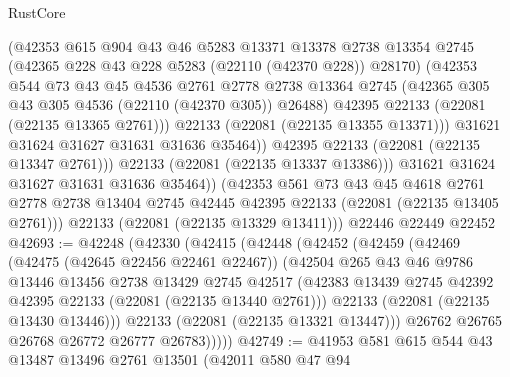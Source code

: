 \begin{lexlean}{RustCore}
\begin{coremodule}
                  (@42353
                    @615
                    @904
                    @43
                    @46
                    @5283
                    @13371
                    @13378
                    @2738
                    @13354
                    @2745
                    (@42365 @228 @43 @228 @5283 (@22110 (@42370 @228)) @28170)
                    (@42353
                      @544
                      @73
                      @43
                      @45
                      @4536
                      @2761
                      @2778
                      @2738
                      @13364
                      @2745
                      (@42365 @305 @43 @305 @4536 (@22110 (@42370 @305)) @26488)
                      @42395
                      @22133
                      (@22081 (@22135 @13365 @2761)))
                    @22133
                    (@22081 (@22135 @13355 @13371)))
                  @31621
                  @31624
                  @31627
                  @31631
                  @31636
                  @35464))
              @42395
              @22133
              (@22081 (@22135 @13347 @2761)))
            @22133
            (@22081 (@22135 @13337 @13386)))
          @31621
          @31624
          @31627
          @31631
          @31636
          @35464))
      (@42353
        @561
        @73
        @43
        @45
        @4618
        @2761
        @2778
        @2738
        @13404
        @2745
        @42445
        @42395
        @22133
        (@22081 (@22135 @13405 @2761)))
      @22133
      (@22081 (@22135 @13329 @13411)))
    @22446
    @22449
    @22452
@42693 := @42248
    (@42330
      (@42415
        (@42448
          (@42452
            (@42459
              (@42469
                (@42475 (@42645 @22456 @22461 @22467))
                (@42504
                  @265
                  @43
                  @46
                  @9786
                  @13446
                  @13456
                  @2738
                  @13429
                  @2745
                  @42517
                  (@42383 @13439 @2745 @42392 @42395 @22133 (@22081 (@22135 @13440 @2761)))
                  @22133
                  (@22081 (@22135 @13430 @13446)))
                @22133
                (@22081 (@22135 @13321 @13447)))
              @26762
              @26765
              @26768
              @26772
              @26777
              @26783)))))
@42749 := @41953
    @581
    @615
    @544
    @43
    @13487
    @13496
    @2761
    @13501
    (@42011
      @580
      @47
      @94

\end{coremodule}
\end{lexlean}
